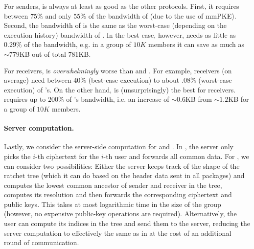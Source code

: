 For senders, \saik is always at least as good as the other protocols. First, it requires between $75\%$ and only $55\%$ of the bandwidth of \protITK (due to the use of mmPKE). Second, the bandwidth of \protCMPKE is the same as the worst-case (depending on the execution history) bandwidth of \saik. In the best case, however, \saik needs as little as $0.29\%$ of the bandwidth, e.g. in a
group of $10K$ members it can save as much as $\sim 779$KB out of total
$781$KB.





For receivers, \protITK is \emph{overwhelmingly} worse than \saik and \protCMPKE. For
example, \saik receivers (on average) need between $40\%$ (best-case execution) to about $.08\%$ (worst-case execution) of \protITK's. On the other hand, \protCMPKE is (unsurprisingly) the best for receivers.  \saik requires up to $200\%$ of \protCMPKE's bandwidth, i.e. an
increase of $\sim 0.6$KB from $\sim 1.2$KB for a group of $10K$ members.


\paragraph{Server computation.}
Lastly, we consider the server-side computation for \saik and \protCMPKE. In \protCMPKE, the server only picks the
$i$-th \mPKE ciphertext for the $i$-th user and forwards all common data. For \saik, we can consider two possibilities:
Either the server keeps track of the shape of the ratchet tree (which it can do based on the header data sent in all
packages) and computes the lowest common ancestor of sender and receiver in the tree, computes its resolution and then
forwards the corresponding ciphertext and public keys. This takes at most logarithmic time in the size of the
group (however, no expensive public-key operations are required). Alternatively, the user can compute its indices in the
tree and send them to the server, reducing the server computation to effectively the same as in \protCMPKE at the cost
of an additional round of communication.

